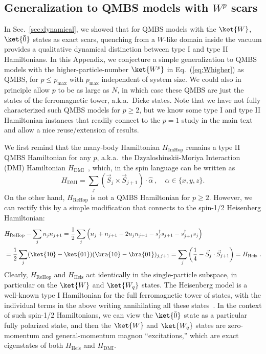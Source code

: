 \documentclass[prx,letterpaper,aps,superscriptaddress,floatfix,twocolumn,nofootinbib]{revtex4-2}
\theoremstyle{definition}
\begin{document}
\subsection{Generalization to QMBS models with $W^p$ scars}
\label{app:Wp_droplet_dyn}
%

In Sec.~\ref{sec:dynamical}, we showed that for QMBS models with the $\ket{W}$, $\ket{\bar{0}}$ states as exact scars, quenching from a $W$-like domain inside the vacuum provides a qualitative dynamical distinction between type I and type II Hamiltonians.
%
In this Appendix, we conjecture a simple generalization to QMBS models with the higher-particle-number $\ket{W^p}$ in Eq.~(\ref{eq:Whigher}) as QMBS, for $p \leq p_{\max}$ with $p_{\max}$ independent of system size.
%
We could also in principle allow $p$ to be as large as $N$, in which case these QMBS are just the states of the ferromagnetic tower, a.k.a.\ Dicke states.
%
Note that we have not fully characterized such QMBS models for $p \geq 2$, but we know some type I and type II Hamiltonian instances that readily connect to the $p = 1$ study in the main text and allow a nice reuse/extension of results.
%

%
We first remind that the many-body Hamiltonian $H_{\text{ImHop}}$ remains a type II QMBS Hamiltonian for any $p$, a.k.a.\ the Dzyaloshinskii-Moriya Interaction (DMI) Hamiltonian $H_{\text{DMI}}$~\cite{Mark2020Eta, moudgalya2023exhaustive}, which, in the spin language can be written as
\begin{equation}
    H_{\text{DMI}} = \sum_j{(\vec{S}_j \times \vec{S}_{j+1})\cdot \hat{\alpha}} ~, \quad \alpha \in \{x, y, z\}.
\label{eq:HDMI}
\end{equation}
%
On the other hand, $H_{\text{ReHop}}$ is not a QMBS Hamiltonian for $p \geq 2$.
%
However, we can rectify this by a simple modification that connects to the spin-1/2 Heisenberg Hamiltonian:
\begin{equation}
\begin{aligned}
& H_{\text{ReHop}} - \sum_j n_j n_{j+1} 
 = \frac{1}{2} \sum_j \left(n_j + n_{j+1} - 2 n_j n_{j+1} - s_j^\dagger s_{j+1} - s_{j+1}^\dagger s_j \right) \\
&= \frac{1}{2} \sum_j (\ket{10} - \ket{01}) (\bra{10} - \bra{01})_{j,j+1} = \sum_j \left(\frac{1}{4} - \vec{S}_j \cdot \vec{S}_{j+1} \right) = H_{\text{Heis}} ~.
\end{aligned}
\end{equation} 
%
Clearly, $H_{\text{ReHop}}$ and $H_{\text{Heis}}$ act identically in the single-particle subspace, in particular on the $\ket{W}$ and $\ket{W_q}$ states.
%
The Heisenberg model is a well-known type I Hamiltonian for the full ferromagnetic tower of states, with the individual terms in the above writing annihilating all these states~\cite{Mark2020Eta, moudgalya2023exhaustive}.
%
In the context of such spin-1/2 Hamiltonians, we can view the $\ket{\bar{0}}$ state as a particular fully polarized state, and then the $\ket{W}$ and $\ket{W_q}$ states are zero-momentum and general-momentum magnon ``excitations,'' which are exact eigenstates of both $H_{\text{Heis}}$ and $H_{\text{DMI}}$.
%
\end{document}
